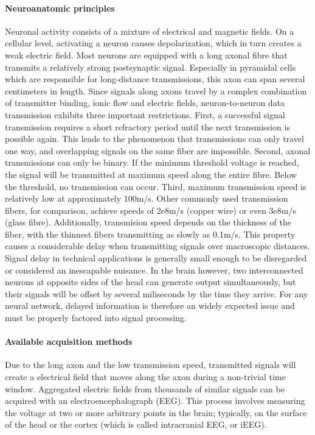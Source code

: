 \paragraph{Neuroanatomic principles}
Neuronal activity consists of a mixture of electrical and magnetic fields.
On a cellular level, activating a neuron causes depolarization, which in turn creates a weak electric field.
Most neurons are equipped with a long axonal fibre that transmits a relatively strong postsynaptic signal.
Especially in pyramidal cells which are responsible for long-distance transmissions, this axon can span several centimeters in length.
Since signals along axons travel by a complex combination of transmitter binding, ionic flow and electric fields, neuron-to-neuron data transmission exhibits three important restrictions.
First, a successful signal transmission requires a short refractory period until the next transmission is possible again.
This leads to the phenomenon that transmissions can only travel one way, and overlapping signals on the same fiber are impossible.
Second, axonal transmissions can only be binary.
If the minimum threshold voltage is reached, the signal will be transmitted at maximum speed along the entire fibre.
Below the threshold, no transmission can occur.
Third, maximum transmission speed is relatively low at approximately 100m/s.
Other commonly used transmission fibers, for comparison, achieve speeds of 2e8m/s (copper wire) or even 3e8m/s (glass fibre).
Additionally, transmision speed depends on the thickness of the fiber, with the thinnest fibers transmitting as slowly as 0.1m/s.
This property causes a considerable delay when transmitting signals over macroscopic distances.
Signal delay in technical applications is generally small enough to be disregarded or considered an inescapable nuisance.
In the brain however, two interconnected neurons at opposite sides of the head can generate output simultaneously, but their signals will be offset by several miliseconds by the time they arrive.
For any neural network, delayed information is therefore an widely expected issue and must be properly factored into signal processing.

\paragraph {Available acquisition methods}
Due to the long axon and the low transmission speed, transmitted signals will create a electrical field that moves along the axon during a non-trivial time window.
Aggregated electric fields from thousands of similar signals can be acquired with an electroencephalograph (EEG).
This process involves measuring the voltage at two or more arbitrary points in the brain; typically, on the surface of the head or the cortex (which is called intracranial EEG, or iEEG).


